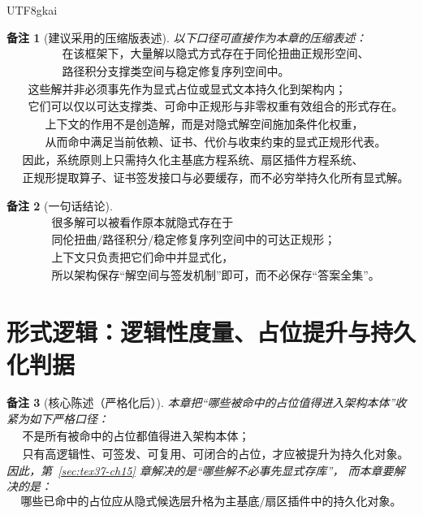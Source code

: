 \documentclass[12pt]{article}
\newtheorem{remark}{备注}[section]
\begin{document}
\begin{CJK*}{UTF8}{gkai}
\begin{remark}[建议采用的压缩版表述]
以下口径可直接作为本章的压缩表述：
\[
  \boxed{
    \begin{aligned}
      &\text{在该框架下，大量解以隐式方式存在于同伦扭曲正规形空间、}\\
      &\text{路径积分支撑类空间与稳定修复序列空间中。}
    \end{aligned}
  }
\]
\[
  \boxed{
    \begin{aligned}
      &\text{这些解并非必须事先作为显式占位或显式文本持久化到架构内；}\\
      &\text{它们可以仅以可达支撑类、可命中正规形与非零权重有效组合的形式存在。}
    \end{aligned}
  }
\]
\[
  \boxed{
    \begin{aligned}
      &\text{上下文的作用不是创造解，而是对隐式解空间施加条件化权重，}\\
      &\text{从而命中满足当前依赖、证书、代价与收束约束的显式正规形代表。}
    \end{aligned}
  }
\]
\[
  \boxed{
    \begin{aligned}
      &\text{因此，系统原则上只需持久化主基底方程系统、扇区插件方程系统、}\\
      &\text{正规形提取算子、证书签发接口与必要缓存，而不必穷举持久化所有显式解。}
    \end{aligned}
  }
\]
\end{remark}

\begin{remark}[一句话结论]
\[
  \boxed{
    \begin{aligned}
      &\text{很多解可以被看作原本就隐式存在于}\\
      &\text{同伦扭曲/路径积分/稳定修复序列空间中的可达正规形；}\\
      &\text{上下文只负责把它们命中并显式化，}\\
      &\text{所以架构保存“解空间与签发机制”即可，而不必保存“答案全集”。}
    \end{aligned}
  }
\]
\end{remark}

\section{形式逻辑：逻辑性度量、占位提升与持久化判据}
\label{sec:tex37-ch16}

\begin{remark}[核心陈述（严格化后）]
本章把“哪些被命中的占位值得进入架构本体”收紧为如下严格口径：
\[
  \boxed{
    \begin{aligned}
      &\text{不是所有被命中的占位都值得进入架构本体；}\\
      &\text{只有高逻辑性、可签发、可复用、可闭合的占位，才应被提升为持久化对象。}
    \end{aligned}
  }
\]
因此，第~\ref{sec:tex37-ch15} 章解决的是“哪些解不必事先显式存库”，
而本章要解决的是：
\[
  \boxed{
    \text{哪些已命中的占位应从隐式候选层升格为主基底/扇区插件中的持久化对象。}
  }
\]
\end{remark}


\end{CJK*}
\end{document}
